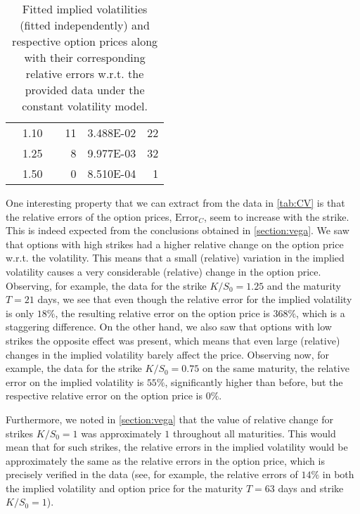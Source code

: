 \begin{table}[H]
\begin{tabular}{@{}cccrcr@{}}
 & 1.10 &  & 11 & \num{3.488E-02} & 22 \\
 & 1.25 &  & 8 & \num{9.977E-03} & 32 \\
 & 1.50 &  & 0 & \num{8.510E-04} & 1 \\ \bottomrule
\end{tabular}
  \caption[Fitted implied volatilities (fitted independently) and respective option prices along with their corresponding relative errors w.r.t. the provided data under the constant volatility model.]{Fitted implied volatilities (fitted independently) and respective option prices along with their corresponding relative errors w.r.t. the provided data under the constant volatility model.}
  \label{tab:CV}
\end{table}

One interesting property that we can extract from the data in \autoref{tab:CV} is that the relative errors of the option prices, $\mathrm{Error}_{C}$, seem to increase with the strike. This is indeed expected from the conclusions obtained in \autoref{section:vega}. We saw that options with high strikes had a higher relative change on the option price w.r.t. the volatility. This means that a small (relative) variation in the implied volatility causes a very considerable (relative) change in the option price. Observing, for example, the data for the strike $K/S_0=1.25$ and the maturity $T=21$ days, we see that even though the relative error for the implied volatility is only $18\%$, the resulting relative error on the option price is $368\%$, which is a staggering difference. On the other hand, we also saw that options with low strikes the opposite effect was present, which means that even large (relative) changes in the implied volatility barely affect the price. Observing now, for example, the data for the strike $K/S_0=0.75$ on the same maturity, the relative error on the implied volatility is $55\%$, significantly higher than before, but the respective relative error on the option price is $0\%$.

Furthermore, we noted in \autoref{section:vega} that the value of relative change for strikes $K/S_0=1$ was approximately $1$ throughout all maturities. This would mean that for such strikes, the relative errors in the implied volatility would be approximately the same as the relative errors in the option price, which is precisely verified in the data (see, for example, the relative errors of $14\%$ in both the implied volatility and option price for the maturity $T=63$ days and strike $K/S_0=1$).

